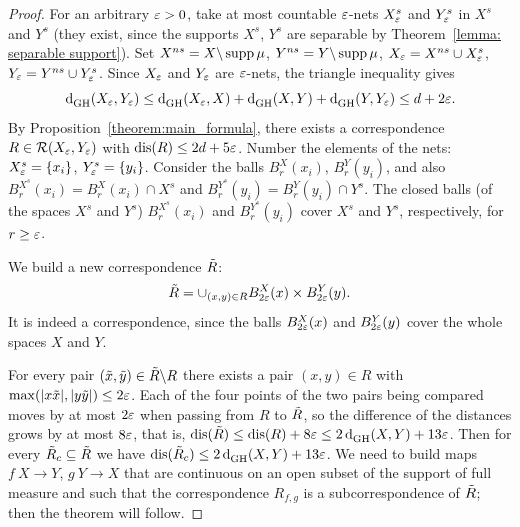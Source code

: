 \begin{proof}
    For an arbitrary ${\varepsilon} > 0$, take at most countable ${\varepsilon}$-nets $X^s_{{\varepsilon}}$ and $Y^s_{\varepsilon}$ in $X^s$ and $Y^s$ (they exist, since the supports $X^s$, $Y^s$ are separable by Theorem~\ref{lemma: separable support}). 
    Set $X^{ns} = X \backslash \operatorname{supp} \mu$, $Y^{ns} = Y \backslash \operatorname{supp} \mu$, $X_{\varepsilon} = X^{ns} \cup X^s_{{\varepsilon}}$,  $Y_{\varepsilon} = Y^{ns} \cup Y^s_{{\varepsilon}}$.
    Since $X_{\varepsilon}$ and $Y_{{\varepsilon}}$ are ${\varepsilon}$-nets, the triangle inequality gives
    $$
    \operatorname{d}^{}_{\mathrm{GH}}(X_{{\varepsilon}},Y_{{\varepsilon}}) \leq  \operatorname{d}^{}_{\mathrm{GH}}(X_{{\varepsilon}},X) + \operatorname{d}^{}_{\mathrm{GH}}(X,Y) + \operatorname{d}^{}_{\mathrm{GH}}(Y,Y_{{\varepsilon}}) \leq d + 2{\varepsilon}.
    $$
    By Proposition~\ref{theorem:main_formula}, there exists a correspondence $R \in \mathcal{R}(X_{{\varepsilon}}, Y_{{\varepsilon}})$ with $\operatorname{dis}(R) \leq 2d + 5{\varepsilon}$.
    Number the elements of the nets: $X^s_{\varepsilon} = \{x_i\}$, $Y^s_{\varepsilon} = \{y_i\}$.
    Consider the balls $B^X_{r}(x_i)$, $B^Y_{r}(y_i)$, and also $B^{X^s}_{r}(x_i) = B^X_{r}(x_i) \cap X^s$ and $B^{Y^s}_{r}(y_i) = B^Y_{r}(y_i) \cap Y^s$.
    The closed balls (of the spaces $X^s$ and $Y^s$) $B^{X^s}_{r}(x_i)$ and $B^{Y^s}_{r}(y_i)$ cover $X^s$ and $Y^s$, respectively, for $r \geq {\varepsilon}$. 

    We build a new correspondence $\tilde{R}$: 
    $$
    \tilde{R} = \cup_{(x,y)\in R} B^X_{2{\varepsilon}}(x) \times B^Y_{2{\varepsilon}}(y).
    $$
    It is indeed a correspondence, since the balls $B^X_{2{\varepsilon}}(x)$ and $B^Y_{2{\varepsilon}}(y)$ cover the whole spaces $X$ and $Y$.\par

    For every pair $(\tilde{x},\tilde{y}) \in \tilde{R} \backslash R$ there exists a pair $(x,y) \in R$ with $\max(|x \tilde{x}|, |y \tilde{y}|) \leq 2{\varepsilon}$.
    Each of the four points of the two pairs being compared moves by at most $2{\varepsilon}$ when passing from $R$ to $\tilde{R}$, so the difference of the distances grows by at most $8{\varepsilon}$, that is, $\operatorname{dis}(\tilde{R}) \leq \operatorname{dis}(R) + 8{\varepsilon} \leq 2\operatorname{d}^{}_{\mathrm{GH}}(X,Y) + 13{\varepsilon}$. 
    Then for every $\tilde{R}_c \subseteq \tilde{R}$ we have $\operatorname{dis}(\tilde{R}_c) \leq 2\operatorname{d}^{}_{\mathrm{GH}}(X,Y) + 13{\varepsilon}$.
    We need to build maps $f \: X \to Y$, $g \: Y \to X$ that are continuous on an open subset of the support of full measure and such that the correspondence $R_{f, g}$ is a subcorrespondence of $\tilde{R}$; then the theorem will follow.\par


\end{proof}

